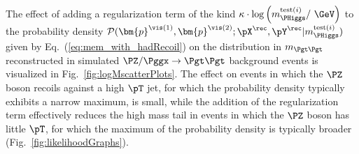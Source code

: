The effect of adding a regularization term of the kind $\kappa \cdot \log \left( m_{\PHiggs}^{\textrm{test}(i)} / \mbox{~\GeV} \right)$ to the 
probability density $\mathcal{P}(\bm{p}^{\vis(1)},\bm{p}^{\vis(2)};\pX^{\rec},\pY^{\rec}|m_{\PHiggs}^{\textrm{test}(i)})$ given by Eq.~(\ref{eq:mem_with_hadRecoil})
on the distribution in $m_{\Pgt\Pgt}$ reconstructed in simulated $\PZ/\Pggx \to \Pgt\Pgt$ background events
is visualized in Fig.~\ref{fig:logMscatterPlots}.
The effect on events in which the $\PZ$ boson recoils against a high $\pT$ jet, for which the probability density typically exhibits a narrow maximum, is small, 
while the addition of the regularization term effectively reduces the high mass tail in events in which the $\PZ$ boson has little $\pT$,
for which the maximum of the probability density is typically broader (\cf Fig.~\ref{fig:likelihoodGraphs}).

